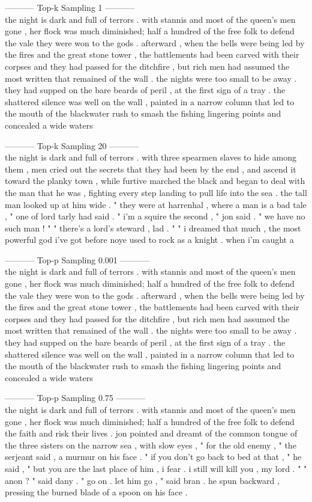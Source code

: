 \documentclass[12pt,article]{article}
\begin{document}
----------- Top-k Sampling 1 -----------\\
the night is dark and full of terrors . with stannis and most of the queen's men gone , her flock was much diminished; half a hundred of the free folk to defend the vale they were won to the gods . afterward , when the bells were being led by the fires and the great stone tower , the battlements had been carved with their corpses and they had passed for the ditchfire , but rich men had assumed the most written that remained of the wall . the nights were too small to be away . they had supped on the bare beards of peril , at the first sign of a tray . the shattered silence was well on the wall , painted in a narrow column that led to the mouth of the blackwater rush to smash the fishing lingering points and concealed a wide waters

----------- Top-k Sampling 20 -----------\\
the night is dark and full of terrors . with three spearmen slaves to hide among them , men cried out the secrets that they had been by the end , and ascend it toward the planky town , while furtive marched the black and began to deal with the man that he was , fighting every step landing to pull life into the sea . the tall man looked up at him wide . " they were at harrenhal , where a man is a bad tale , " one of lord tarly had said . " i'm a squire the second , " jon said . " we have no such man ! " " there's a lord's steward , lad . " " i dreamed that much , the most powerful god i've got before noye used to rock as a knight . when i'm caught a

----------- Top-p Sampling 0.001 -----------\\
the night is dark and full of terrors . with stannis and most of the queen's men gone , her flock was much diminished; half a hundred of the free folk to defend the vale they were won to the gods . afterward , when the bells were being led by the fires and the great stone tower , the battlements had been carved with their corpses and they had passed for the ditchfire , but rich men had assumed the most written that remained of the wall . the nights were too small to be away . they had supped on the bare beards of peril , at the first sign of a tray . the shattered silence was well on the wall , painted in a narrow column that led to the mouth of the blackwater rush to smash the fishing lingering points and concealed a wide waters

----------- Top-p Sampling 0.75 -----------\\
the night is dark and full of terrors . with stannis and most of the queen's men gone , her flock was much diminished; half a hundred of the free folk to defend the faith and risk their lives . jon pointed and dreamt of the common tongue of the three sisters on the narrow sea , with slow eyes , " for the old enemy , " the serjeant said , a murmur on his face . " if you don't go back to bed at that , " he said , " but you are the last place of him , i fear . i still will kill you , my lord . " " anon ? " said dany . " go on . let him go , " said bran . he spun backward , pressing the burned blade of a spoon on his face .
\end{document}
